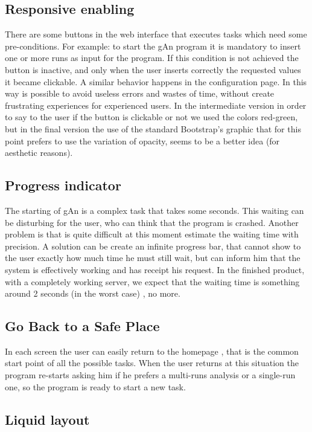 \subsection{Responsive enabling}
There are some buttons in the web interface that executes tasks which need some pre-conditions. For example: to start the gAn program it is mandatory to insert one or more runs as input for the program. If this condition is not achieved the button is inactive, and only when the user inserts correctly the requested values it became clickable. A similar behavior happens in the configuration page. In this way is possible to avoid useless errors and wastes of time, without create frustrating experiences for experienced users. In the intermediate version in order to say to the user if the button is clickable or not we used the colors red-green, but in the final version the use of the standard Bootstrap's graphic that for this point prefers to use the variation of opacity, seems to be a better idea (for aesthetic reasons).   

\subsection{Progress indicator}
The starting of gAn is a complex task that takes some seconds. This waiting can be disturbing for the user, who can think that the program is crashed. Another problem is that is quite difficult at this moment estimate the waiting time with precision. A solution can be create an infinite progress bar, that cannot show to the user exactly how much time he must still wait, but can inform him that the system is effectively working and has receipt his request. In the finished product, with a completely working server, we expect that the waiting time is something around 2 seconds (in the worst case) , no more. 

\subsection{Go Back to a Safe Place}
In each screen the user can easily return to the homepage , that is the common start point of all the possible tasks. When the user returns at this situation the program re-starts asking him if he prefers a multi-runs analysis or a single-run one, so the program is ready to start a new task. 

\subsection{Liquid layout}


